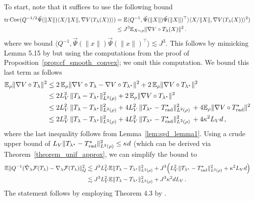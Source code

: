 \documentclass[twoside]{article}
\newcommand{\cF}{\mathcal{F}}
\newcommand{\1}{\mathds{1}}
\newcommand*{\E}{\mathbb E}
\DeclareMathOperator{\tr}{tr}
\theoremstyle{plain}
\theoremstyle{definition}
\theoremstyle{remark}
\begin{document}
To start, note that it suffices to use the following bound
\begin{align*}
   \tr {\rm Cov}(Q^{-1/2}\vec\Psi(\|X\|)\langle X/\|X\|, \nabla V(T_\lambda(X))\rangle) &= \E \langle Q^{-1}, \vec\Psi(\|X\|)\vec\Psi(\|X\|)^{\top}\rangle \langle X/\|X\|, \nabla V(T_\lambda(X))\rangle^2) \\
   &\leq J^3 \E_{X\sim\rho}\|\nabla V \circ T_\lambda(X)\|^2\,.
\end{align*}
where we bound $\langle Q^{-1},\vec\Psi(\|x\|)\vec\Psi(\|x\|)^\top\rangle \lesssim J^3$. This follows by mimicking Lemma 5.15 by \citet{JiaChePoo24MFVI} but using the computations from the proof of Proposition~\ref{prop:cf_smooth_convex}; we omit this computation. We bound this last term as follows
\begin{align*}
    \E_\rho\|\nabla V \circ T_\lambda\|^2
    &\leq 2\,\E_\rho\|\nabla V\circ T_\lambda - \nabla V\circ T_{\lambda^\star}\|^2 + 2\, \E_\rho\|\nabla V\circ T_{\lambda^\star}\|^2 \\
    &\leq 2 L^2_V\, \|T_\lambda - T_{\lambda^\star}\|^2_{L^2(\rho)} + 2\, \E_\rho\|\nabla V\circ T_{\lambda^\star}\|^2 \\
    &\leq 2 L^2_V\, \|T_\lambda - T_{\lambda^\star}\|^2_{L^2(\rho)} + 4L^2_V\, \|T_{\lambda^\star} - T^\star_{\rm rad}\|^2_{L^2(\rho)}\, + 4\E_\rho\|\nabla V\circ T^\star_{\rm rad}\|^2 \\
    &\leq 2 L^2_V\, \|T_\lambda - T_{\lambda^\star}\|^2_{L^2(\rho)} + 4L^2_V\, \|T_{\lambda^\star} - T^\star_{\rm rad}\|^2_{L^2(\rho)}\, + 4\kappa^2 L_V d\,,
\end{align*}
where the last inequality follows from Lemma~\ref{lem:sgd_lemma1}. Using a crude upper bound of $L_V\|T_{\lambda^\star} - T^\star_{\rm rad}\|^2_{L^2(\rho)} \leq \kappa d$ (which can be derived via Theorem~\ref{theorem_unif_approx}, we can simplify the bound to
\begin{align*}
\E\|Q^{-1}(\hat{\nabla}_\lambda\cF(T_\lambda) - {\nabla}_\lambda\cF(T_\lambda)\|^2_{Q} &\lesssim J^3 L_V^2 \E\|T_\lambda - T_{\lambda^\star}\|^2_{L^2(\rho)} + J^3 \Bigl(L_V^2\|T_{\lambda^\star} - T_{\rm rad}^\star\|^2_{L^2(\rho)} + \kappa^2L_Vd\Bigr) \\
&\lesssim J^3 L_V^2 \E\|T_\lambda - T_{\lambda^\star}\|^2_{L^2(\rho)} + J^3 \kappa^2 d L_V\,.
\end{align*}
The statement follows by employing Theorem 4.3 by \cite{JiaChePoo24MFVI}.
\end{document}

